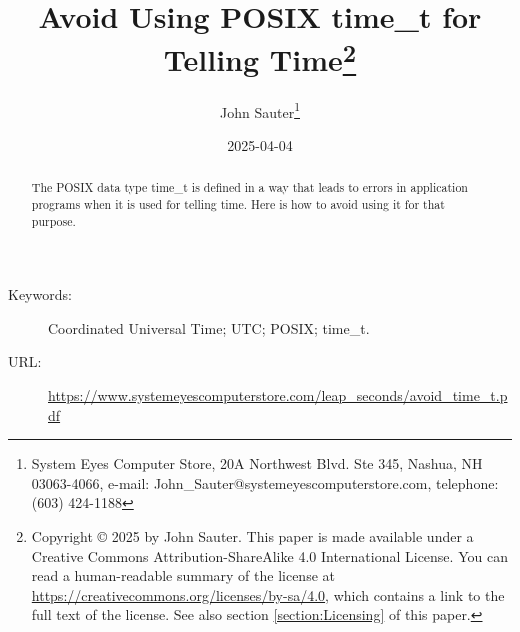 \documentclass[letterpaper,twoside]{article}
\begin{document}
\title{Avoid Using POSIX {\ttfamily time\_t} for Telling
  Time\footnote{Copyright
    {\copyright} 2025 by John Sauter.
    This paper is made available under a
    Creative Commons Attribution-ShareAlike 4.0 International License.
    You can read a human-readable summary of the license at
    \href{https://creativecommons.org/licenses/by-sa/4.0}{https://creativecommons.org/licenses/by-sa/4.0},
    which contains a link to the full text of the license.
    See also section \ref{section:Licensing} of this paper.}
}
\author{John Sauter\footnote{
    System Eyes Computer Store,
    20A Northwest Blvd.  Ste 345,
    Nashua, NH  03063-4066,
    e-mail: John\_Sauter@systemeyescomputerstore.com,
    telephone: (603) 424-1188}}

\date{2025-04-04}
\maketitle
\begin{abstract}
  The POSIX data type {\ttfamily time\_t} is defined in a way that leads
  to errors in application programs when it is used for telling time.
  Here is how to avoid using it for that purpose.
\end{abstract}
\begin{description}
\item[Keywords:]Coordinated Universal Time; UTC; POSIX; time\_t.
\item[URL:]\href{https://www.systemeyescomputerstore.com/leap\_seconds/avoid\_time\_t.pdf}{https://www.systemeyescomputerstore.com/leap\_seconds/avoid\_time\_t.pdf}
\end{description}
\newpage
\end{document}
